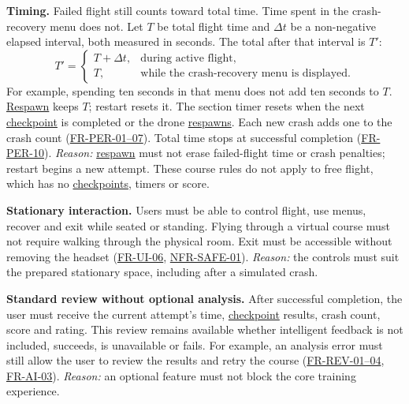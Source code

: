 \documentclass[12pt]{article}
\begin{document}
\begin{description}
\textbf{Timing.} Failed flight still counts toward total time. Time spent in
the crash-recovery menu does not. Let $T$ be total flight time and $\Delta t$
be a non-negative elapsed interval, both measured in seconds. The total after
that interval is $T'$:
\[
 T'=\begin{cases}
 T+\Delta t, & \text{during active flight},\\
 T, & \text{while the crash-recovery menu is displayed}.
 \end{cases}
\]
For example, spending ten seconds in that menu does not add ten seconds to
$T$. \hyperlink{glos:Respawn}{Respawn} keeps $T$; restart resets it. The section timer resets when the
next \hyperlink{glos:Checkpoint}{checkpoint} is completed or the drone \hyperlink{glos:Respawn}{respawns}. Each new crash adds one to
the crash count (\hyperref[sec:s2-performance]{FR-PER-01--07}). Total time
stops at successful completion (\hyperref[sec:s2-performance]{FR-PER-10}).
\textit{Reason:} \hyperlink{glos:Respawn}{respawn} must not erase failed-flight time or crash penalties;
restart begins a new attempt.
These course rules do not apply to free flight, which has no \hyperlink{glos:Checkpoint}{checkpoints},
timers or score.

\item[{\hyperref[et-safety]{E-I-03}:}]\label{ei-stationary}
\textbf{Stationary interaction.}
Users must be able to control flight, use menus, recover and exit while seated
or standing. Flying through a virtual course must not require walking through
the physical room. Exit must be accessible without removing the headset
(\hyperref[sec:s2-interface]{FR-UI-06},
\hyperref[sec:s2-nfr]{NFR-SAFE-01}).
\textit{Reason:} the controls must suit the prepared stationary space, including
after a simulated crash.

\item[{\hyperref[et-review]{E-I-04}:}]\label{ei-review}
\textbf{Standard review without optional analysis.}
After successful completion, the user must receive the current attempt's time,
\hyperlink{glos:Checkpoint}{checkpoint} results, crash count, score and rating. This review remains available
whether intelligent feedback is not included, succeeds, is unavailable or fails.
For example, an analysis error must still allow the user to review the results
and retry the course (\hyperref[sec:s2-review]{FR-REV-01--04},
\hyperref[sec:s2-ai]{FR-AI-03}).
\textit{Reason:} an optional feature must not block the core training experience.
\end{description}
\end{document}
